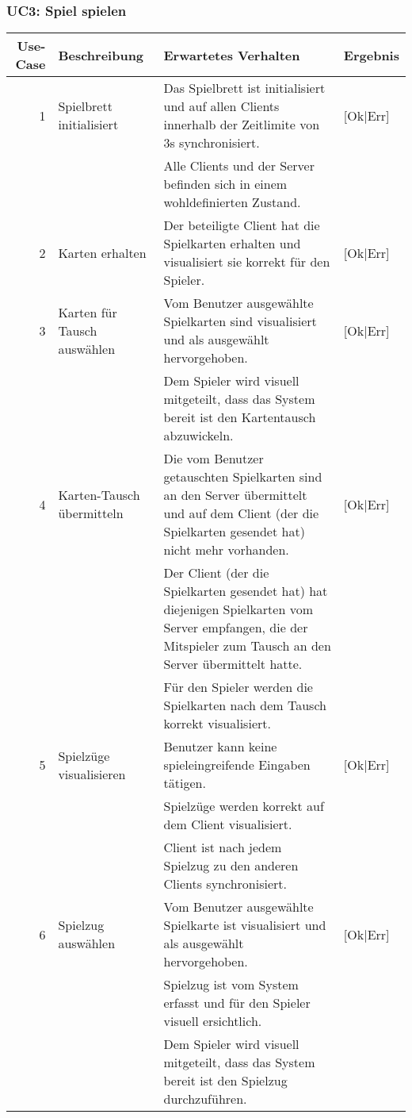 \documentclass[a4paper,12pt,halfparskip,DIV14]{scrartcl}
\begin{document}
\subsubsection{UC3: Spiel spielen}\label{sub:uc3_spiel_spielen} %
\begin {tabular}{r | p{3cm} | p{8cm} | l}
\toprule
\textbf{Use-Case} & \textbf{Beschreibung} & \textbf{Erwartetes Verhalten} & \textbf{Ergebnis} \\
\midrule
1 & Spielbrett initialisiert & Das Spielbrett ist initialisiert und auf allen Clients innerhalb der Zeitlimite von 3s synchronisiert. & [Ok|Err] \\
 \cline{3-4} & & Alle Clients und der Server befinden sich in einem wohldefinierten Zustand. & \\
\midrule
2 & Karten erhalten & Der beteiligte Client hat die Spielkarten erhalten und visualisiert sie korrekt für den Spieler. & [Ok|Err] \\
\midrule
3 & Karten für Tausch auswählen & Vom Benutzer ausgewählte Spielkarten sind visualisiert und als ausgewählt hervorgehoben. & [Ok|Err] \\
 \cline{3-4} & & Dem Spieler wird visuell mitgeteilt, dass das System bereit ist den Kartentausch abzuwickeln. & \\
\midrule
4 & Karten-Tausch übermitteln & Die vom Benutzer getauschten Spielkarten sind an den Server übermittelt und auf dem Client (der die Spielkarten gesendet hat) nicht mehr vorhanden. & [Ok|Err] \\
 \cline{3-4} & & Der Client (der die Spielkarten gesendet hat) hat diejenigen Spielkarten vom Server empfangen, die der Mitspieler zum Tausch an den Server übermittelt hatte. & \\
 \cline{3-4} & & Für den Spieler werden die Spielkarten nach dem Tausch korrekt visualisiert. & \\
\midrule
5 & Spielzüge visualisieren & Benutzer kann keine spieleingreifende Eingaben tätigen. & [Ok|Err] \\
 \cline{3-4} & & Spielzüge werden korrekt auf dem Client visualisiert. & \\
 \cline{3-4} & & Client ist nach jedem Spielzug zu den anderen Clients synchronisiert. & \\
\midrule
6 & Spielzug auswählen & Vom Benutzer ausgewählte Spielkarte ist visualisiert und als ausgewählt hervorgehoben. & [Ok|Err] \\
 \cline{3-4} & & Spielzug ist vom System erfasst und für den Spieler visuell ersichtlich. & \\
 \cline{3-4} & & Dem Spieler wird visuell mitgeteilt, dass das System bereit ist den Spielzug durchzuführen. & \\
\bottomrule
\end{tabular}
\end{document}
